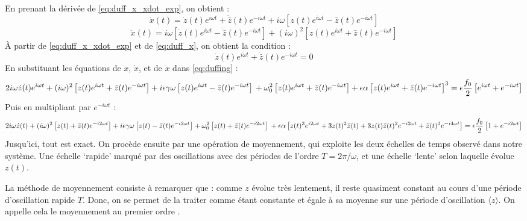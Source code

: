 En prenant la dérivée de \eqref{eq:duff_x_xdot_exp}, on obtient :
\begin{equation}
    \dot{x}(t) = \dot{z}(t)e^{i\omega t} + \dot{\bar{z}}(t) e^{-i\omega t} + i\omega \left[ z(t)e^{i\omega t} - \bar{z}(t) e^{-i\omega t} \right]
    \label{eq:duff_x}
\end{equation}
\begin{equation}
    \ddot{x}(t) = i\omega \left[ \dot{z}(t)e^{i\omega t} - \dot{\bar{z}}(t) e^{-i\omega t} \right] + (i\omega)^2 \left[ z(t)e^{i\omega t} + \bar{z}(t) e^{-i\omega t} \right]
\end{equation}
À partir de \eqref{eq:duff_x_xdot_exp} et de \eqref{eq:duff_x}, on obtient la condition :
\begin{equation}
    \dot{z}(t)e^{i\omega t} + \dot{\bar{z}}(t) e^{-i\omega t} = 0
\end{equation}
%
En substituant les équations de $x$, $\dot{x}$, et de $\ddot{x}$ dans \eqref{eq:duffing} :
%
\begin{dmath}
    2i\omega \dot{z}(t)e^{i\omega t} + (i\omega)^2 \left[ z(t)e^{i\omega t} + \bar{z}(t) e^{-i\omega t} \right]
    + i\epsilon\gamma\omega \left[ z(t)e^{i\omega t} - \bar{z}(t) e^{-i\omega t} \right] \\
    + \omega_0^2 \left[ z(t)e^{i\omega t} + \bar{z}(t) e^{-i\omega t} \right]
    + \epsilon \alpha \left[ z(t)e^{i\omega t} + \bar{z}(t) e^{-i\omega t} \right]^3 = \epsilon \frac{f_0}{2}\left[ e^{i\omega t} + e^{-i\omega t} \right]
\end{dmath}
Puis en multipliant par $e^{-i\omega t}$ :
\begin{dmath}
    2i\omega \dot{z}(t) + (i\omega)^2 \left[ z(t) + \bar{z}(t) e^{-i 2 \omega t} \right]
    + i\epsilon\gamma\omega \left[ z(t) - \bar{z}(t) e^{-i 2 \omega t} \right]
    + \omega_0^2 \left[ z(t) + \bar{z}(t) e^{-i 2 \omega t} \right] \\
    + \epsilon \alpha \left[ z(t)^3 e^{i 2 \omega t} + 3 z(t)^2 \bar{z}(t) + 3z(t)\bar{z}(t)^2 e^{-i2\omega t} + \bar{z}(t)^3 e^{-i4 \omega t} \right]
    = \epsilon \frac{f_0}{2}\left[ 1 + e^{-i 2 \omega t} \right]
    \label{eq:duff_pre_av}
\end{dmath}
%
%
%
Jusqu'ici, tout est exact. On procède ensuite par une opération de moyennement, qui exploite les deux échelles de temps observé dans notre système. 
Une échelle `rapide' marqué par des oscillations avec des périodes de l'ordre $T = 2\pi / \omega$, 
et une échelle `lente' selon laquelle évolue $z(t)$. 

La méthode de moyennement consiste à remarquer que : comme $z$ évolue très lentement, 
il reste quasiment constant au cours d'une période d'oscillation rapide $T$. 
Donc, on se permet de la traiter comme étant constante et égale à sa moyenne sur une période d'oscillation $\langle z \rangle$.
On appelle cela le moyennement au premier ordre \cite{rand_lecture_2012}.

